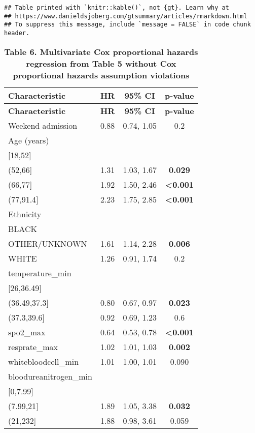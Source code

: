 \documentclass[
]{article}
\begin{document}
\begin{verbatim}
## Table printed with `knitr::kable()`, not {gt}. Learn why at
## https://www.danieldsjoberg.com/gtsummary/articles/rmarkdown.html
## To suppress this message, include `message = FALSE` in code chunk header.
\end{verbatim}

\begin{longtable}[]{@{}lccc@{}}
\caption{\textbf{Table 6. Multivariate Cox proportional hazards
regression from Table 5 without Cox proportional hazards assumption
violations}}\tabularnewline
\toprule\noalign{}
\textbf{Characteristic} & \textbf{HR} & \textbf{95\% CI} &
\textbf{p-value} \\
\midrule\noalign{}
\endfirsthead
\toprule\noalign{}
\textbf{Characteristic} & \textbf{HR} & \textbf{95\% CI} &
\textbf{p-value} \\
\midrule\noalign{}
\endhead
\bottomrule\noalign{}
\endlastfoot
Weekend admission & 0.88 & 0.74, 1.05 & 0.2 \\
Age (years) & & & \\
{[}18,52{]} & & & \\
(52,66{]} & 1.31 & 1.03, 1.67 & \textbf{0.029} \\
(66,77{]} & 1.92 & 1.50, 2.46 & \textbf{\textless0.001} \\
(77,91.4{]} & 2.23 & 1.75, 2.85 & \textbf{\textless0.001} \\
Ethnicity & & & \\
BLACK & & & \\
OTHER/UNKNOWN & 1.61 & 1.14, 2.28 & \textbf{0.006} \\
WHITE & 1.26 & 0.91, 1.74 & 0.2 \\
temperature\_min & & & \\
{[}26,36.49{]} & & & \\
(36.49,37.3{]} & 0.80 & 0.67, 0.97 & \textbf{0.023} \\
(37.3,39.6{]} & 0.92 & 0.69, 1.23 & 0.6 \\
spo2\_max & 0.64 & 0.53, 0.78 & \textbf{\textless0.001} \\
resprate\_max & 1.02 & 1.01, 1.03 & \textbf{0.002} \\
whitebloodcell\_min & 1.01 & 1.00, 1.01 & 0.090 \\
bloodureanitrogen\_min & & & \\
{[}0,7.99{]} & & & \\
(7.99,21{]} & 1.89 & 1.05, 3.38 & \textbf{0.032} \\
(21,232{]} & 1.88 & 0.98, 3.61 & 0.059 \\

\end{longtable}
\end{document}
